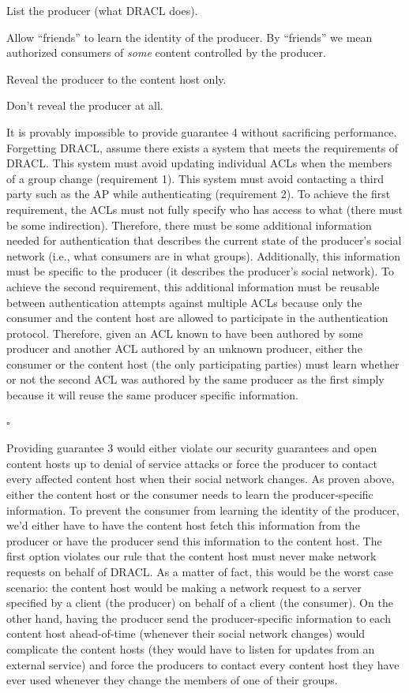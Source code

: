\documentclass[pdftex,12pt,a4papaer,twoside,notitlepage]{report}
\begin{document}
\begin{compactenum}
\item List the producer (what DRACL does).
\item Allow ``friends'' to learn the identity of the producer. By ``friends'' we
  mean authorized consumers of \emph{some} content controlled by the producer.
\item Reveal the producer to the content host only.
\item Don't reveal the producer at all.
\end{compactenum}

It is provably impossible to provide guarantee 4 without sacrificing
performance. Forgetting DRACL, assume there exists a system that meets the
requirements of DRACL. This system must avoid updating individual ACLs when the
members of a group change (requirement 1). This system must avoid contacting a
third party such as the AP while authenticating (requirement 2). To achieve the
first requirement, the ACLs must not fully specify who has access to what
(there must be some indirection). Therefore, there must be some additional
information needed for authentication that describes the current state of the
producer's social network (i.e., what consumers are in what groups).
Additionally, this information must be specific to the producer (it describes
the producer's social network). To achieve the second requirement, this
additional information must be reusable between authentication attempts against
multiple ACLs because only the consumer and the content host are allowed to
participate in the authentication protocol. Therefore, given an ACL known to
have been authored by some producer and another ACL authored by an unknown
producer, either the consumer or the content host (the only participating
parties) must learn whether or not the second ACL was authored by the same
producer as the first simply because it will reuse the same producer specific
information.

{\hfill $\square$}

Providing guarantee 3 would either violate our security guarantees and open
content hosts up to denial of service attacks or force the producer to contact
every affected content host when their social network changes. As proven above,
either the content host or the consumer needs to learn the producer-specific
information. To prevent the consumer from learning the identity of the producer,
we'd either have to have the content host fetch this information from the
producer or have the producer send this information to the content host. The
first option violates our rule that the content host must never make network
requests on behalf of DRACL\@. As a matter of fact, this would be the worst case
scenario: the content host would be making a network request to a server
specified by a client (the producer) on behalf of a client (the consumer). On
the other hand, having the producer send the producer-specific information to
each content host ahead-of-time (whenever their social network changes) would
complicate the content hosts (they would have to listen for updates from an
external service) and force the producers to contact every content host they
have ever used whenever they change the members of one of their groups.
\end{document}

